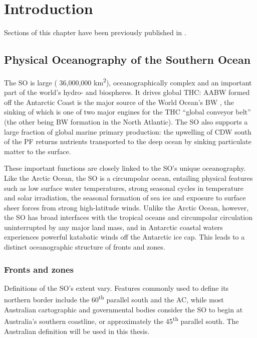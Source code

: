 \chapter{Introduction} 
\label{ch:intro}

Sections of this chapter have been previously published in .

\section{Physical Oceanography of the Southern Ocean}

The \ac{SO} is large (\textapprox{} 36,000,000 km\textsuperscript{2}), oceanographically complex and an important part of the world's hydro- and biospheres.
It drives global \ac{THC}: \ac{AABW} formed off the Antarctic Coast is the major source of the World Ocean's \ac{BW} \cite{Jacobs:2004hv}, the sinking of which is one of two major engines for the \ac{THC} ``global conveyor belt'' (the other being \ac{BW} formation in the North Atlantic).
The \ac{SO} also supports a large fraction of global marine primary production: the upwelling of \ac{CDW} south of the \ac{PF} returns nutrients transported to the deep ocean by sinking particulate matter \cite{Rath:1998wm} to the surface.

These important functions are closely linked to the \ac{SO}'s unique oceanography.
Like the Arctic Ocean, the \ac{SO} is a circumpolar ocean, entailing physical features such as low surface water temperatures, strong seasonal cycles in temperature and solar irradiation, the seasonal formation of sea ice and exposure to surface sheer forces from strong high-latitude winds.
Unlike the Arctic Ocean, however, the \ac{SO} has broad interfaces with the tropical oceans and circumpolar circulation uninterrupted by any major land mass, and in Antarctic coastal waters experiences powerful katabatic winds off the Antarctic ice cap.
This leads to a distinct oceanographic structure of fronts and zones.

\subsection{Fronts and zones}

Definitions of the \ac{SO}'s extent vary.
Features commonly used to define its northern border include the 60\textsuperscript{th} parallel south and the \ac{AC}, while most Australian cartographic and governmental bodies consider the \ac{SO} to begin at Australia's southern coastline, or approximately the 45\textsuperscript{th} parallel south.
The Australian definition will be used in this thesis.

